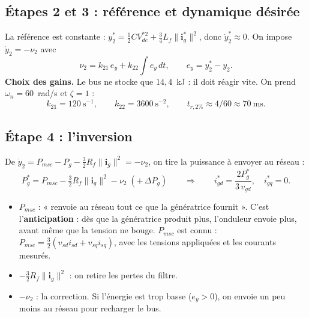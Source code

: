 \documentclass[11pt,a4paper]{article}
\newcommand{\bv}[1]{\boldsymbol{#1}}
\begin{document}
\subsection{Étapes 2 et 3 : référence et dynamique désirée}
La référence est constante : $y_2^* = \tfrac12 C V_{dc}^{*2} + \tfrac34 L_f\|\bv{i}_g^*\|^2$, donc
$\dot y_2^* \approx 0$. On impose $\dot y_2 = -\nu_2$ avec
\begin{equation}
\nu_2 = k_{21}\,e_y + k_{22}\!\int\! e_y\,dt, \qquad e_y = y_2^* - y_2 .
\end{equation}
\textbf{Choix des gains.} Le bus ne stocke que $14{,}4$~kJ : il doit réagir vite. On prend
$\omega_n = 60$~rad/s et $\zeta = 1$ :
\begin{equation}
k_{21} = 120~\text{s}^{-1}, \qquad k_{22} = 3600~\text{s}^{-2}, \qquad t_{r,2\%}\approx 4/60 \approx 70~\text{ms}.
\end{equation}

\subsection{Étape 4 : l'inversion}
De $\dot y_2 = P_{msc} - P_g - \tfrac32 R_f\|\bv{i}_g\|^2 = -\nu_2$, on tire la puissance à envoyer au réseau :
\begin{equation}
\boxed{P_g^* = P_{msc} - \tfrac32 R_f\|\bv{i}_g\|^2 - \nu_2 \;(+\,\Delta P_g)}
\qquad\Longrightarrow\qquad
i_{gd}^* = \frac{2P_g^*}{3\,v_{gd}}, \quad i_{gq}^* = 0 .
\end{equation}
\begin{itemize}
\item $P_{msc}$ : « renvoie au réseau tout ce que la génératrice fournit ». C'est l'\textbf{anticipation} :
      dès que la génératrice produit plus, l'onduleur envoie plus, avant même que la tension ne bouge.
      $P_{msc}$ est connu : $P_{msc} = \tfrac32(v_{sd}i_{sd}+v_{sq}i_{sq})$, avec les tensions appliquées et les
      courants mesurés.
\item $-\tfrac32 R_f\|\bv{i}_g\|^2$ : on retire les pertes du filtre.
\item $-\nu_2$ : la correction. Si l'énergie est trop basse ($e_y>0$), on envoie un peu moins au réseau
      pour recharger le bus.
\end{itemize}
\end{document}
